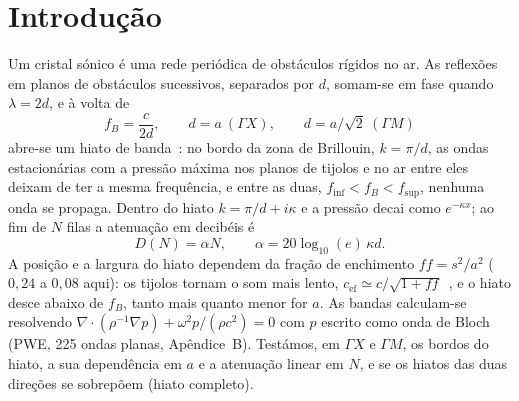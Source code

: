 \documentclass[10pt,twocolumn,a4paper]{article}
\newcommand{\GX}{\Gamma X}
\newcommand{\GM}{\Gamma M}
\newcommand{\finf}{f_\text{inf}}
\newcommand{\fsup}{f_\text{sup}}
\begin{document}
\section{Introdução}
Um cristal sónico é uma rede periódica de obstáculos rígidos no ar. As reflexões em planos
de obstáculos sucessivos, separados por $d$, somam-se em fase quando $\lambda=2d$, e à volta de
\begin{equation}
  f_B=\frac{c}{2d},\qquad d=a\ (\GX),\qquad d=a/\sqrt2\ (\GM)
\end{equation}
abre-se um hiato de banda~\cite{martinez1995,kushwaha1993}: no bordo da zona de Brillouin,
$k=\pi/d$, as ondas estacionárias com a pressão máxima nos planos de tijolos e no ar entre eles
deixam de ter a mesma frequência, e entre as duas, $\finf<f_B<\fsup$, nenhuma onda se propaga.
Dentro do hiato $k=\pi/d+i\kappa$ e a pressão decai como $e^{-\kappa x}$; ao fim de $N$ filas a
atenuação em decibéis é
\begin{equation}
  D(N)=\alpha N,\qquad \alpha=20\log_{10}(e)\,\kappa d .
  \label{eq:DN}
\end{equation}
A posição e a largura do hiato dependem da fração de enchimento $f\!f=s^2/a^2$ ($0{,}24$ a $0{,}08$
aqui): os tijolos tornam o som mais lento, $c_\text{ef}\simeq c/\sqrt{1+f\!f}$~\cite{krokhin2003}, e o
hiato desce abaixo de $f_B$, tanto mais quanto menor for $a$. As bandas calculam-se resolvendo
$\nabla\!\cdot(\rho^{-1}\nabla p)+\omega^2p/(\rho c^2)=0$ com $p$ escrito como onda de Bloch (PWE,
225 ondas planas, Apêndice~B).
Testámos, em $\GX$ e $\GM$, os bordos do hiato, a sua dependência em $a$ e a atenuação linear em $N$,
e se os hiatos das duas direções se sobrepõem (hiato completo).

\end{document}
